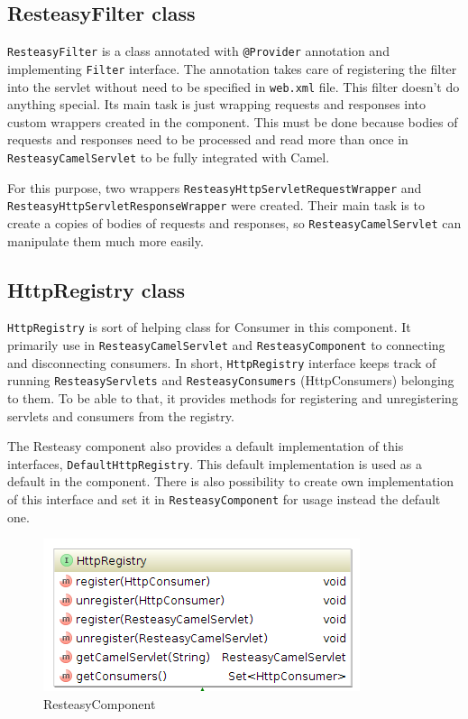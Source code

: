 \documentclass[12pt,final,oneside]{fithesis2}
\begin{document}
\subsection*{ResteasyFilter class}
\texttt{ResteasyFilter} is a class annotated with \texttt{@Provider} annotation and implementing \texttt{Filter} interface. The annotation takes care of registering the filter into the servlet without need to be specified in \texttt{web.xml} file. This filter doesn't do anything special. Its main task is just wrapping requests and responses into custom wrappers created in the component. This must be done because bodies of requests and responses need to be processed and read more than once in \texttt{ResteasyCamelServlet} to be fully integrated with Camel.

For this purpose, two wrappers \texttt{ResteasyHttpServletRequestWrapper} and \texttt{ResteasyHttpServletResponseWrapper} were created. Their main task is to create a copies of bodies of requests and responses, so  \texttt{ResteasyCamelServlet} can manipulate them much more easily.


\subsection{HttpRegistry class}\label{registry}
\texttt{HttpRegistry} is sort of helping class for Consumer in this component. It primarily use in \texttt{ResteasyCamelServlet} and \texttt{ResteasyComponent} to connecting and disconnecting consumers. In short, \texttt{HttpRegistry} interface keeps track of running \texttt{ResteasyServlets} and \texttt{ResteasyConsumers} (HttpConsumers) belonging to them.  To be able to that, it provides methods for registering and unregistering servlets and consumers from the registry.

The Resteasy component also provides a default implementation of this interfaces, \texttt{DefaultHttpRegistry}. This default implementation is used as a default in the component. There is also possibility to create own implementation of this interface and set it in \texttt{ResteasyComponent} for usage instead the default one. 

\begin{figure}[!h]
\centering
\includegraphics[width=0.8\linewidth]{images/registry.png}
\caption{ResteasyComponent}
\label{comp}
\end{figure}
\end{document}
